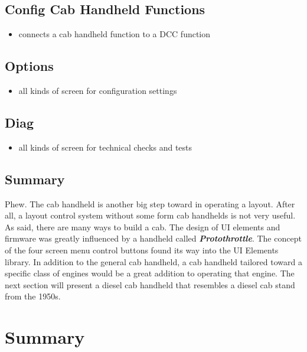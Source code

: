 \subsection{Config Cab Handheld Functions}

\begin{itemize}
\item connects a cab handheld function to a DCC function
\end{itemize}

\subsection{Options}

\begin{itemize}
\item all kinds of screen for configuration settings
\end{itemize}

\subsection{Diag}

\begin{itemize}
\item all kinds of screen for technical checks and tests
\end{itemize}

\subsection{Summary}

Phew. The cab handheld is another big step toward in operating a layout. After all, a layout control system without some form cab handhelds is not very useful. As said, there are many ways to build a cab. The design of UI elements and firmware was greatly influenced by a handheld called \textbf{\textit{Protothrottle}}. The concept of the four screen menu control buttons found its way into the UI Elements library. In addition to the general cab handheld, a cab handheld tailored toward a specific class of engines would be a great addition to operating that engine. The next section will present a diesel cab handheld that resembles a diesel cab stand from the 1950s.


\section{Summary}

